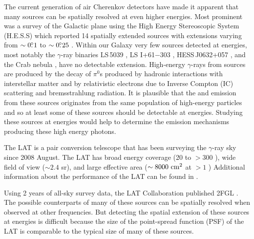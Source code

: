 The current generation of air Cherenkov detectors have made it apparent
that many sources can be spatially resolved at even higher energies.
Most prominent was a survey of the Galactic plane using the High Energy
Stereoscopic System (H.E.S.S) which reported 14 spatially extended
sources with extensions varying from $\sim0\mbox{$.\!\!^\circ$}1$ to $\sim0\mbox{$.\!\!^\circ$}25$
\citep{aharonian_2006_h.e.s.s.-survey}.  Within our Galaxy very few
sources detected at \tev energies, most notably the $\gamma$-ray
binaries LS\,5039 \citep{aharonian_2006a_orbital-modulation},
LS I+61$-$303 \citep{albert_2006a_variable-very-high-energy,
acciari_2011a_veritas-observations}, HESS\,J0632+057
\citep{aharonian_2007a_discovery-point-like}, and the Crab nebula
\citep{weekes_1989a_observation-gamma}, have no detectable extension.
High-energy $\gamma$-rays from \tev sources are produced by the decay
of $\pi^0$s produced by hadronic interactions with interstellar matter
and by relativistic electrons due to Inverse Compton (IC) scattering and
bremsstrahlung radiation.  It is plausible that the \gev and \tev emission
from these sources originates from the same population of high-energy
particles and so at least some of these sources should be detectable at
\gev energies.  Studying these \tev sources at \gev energies would help
to determine the emission mechanisms producing these high energy photons.

The LAT is a pair conversion telescope that has been surveying
the $\gamma$-ray sky since 2008 August.  The LAT has broad energy
coverage (20 \mev to $>300$ \gev), wide field of view ($\sim 2.4$
sr), and large effective area ($\sim 8000\ \cm^2$ at $>1$ \gev)
Additional information about the performance of the LAT can be found
in \cite{atwood_2009a_large-telescope}.

Using 2 years of all-sky survey data, the LAT Collaboration published
2FGL \citep[2FGL,][]{nolan_2012_fermi-large}.  The possible counterparts
of many of these sources can be spatially resolved when observed at other
frequencies. But detecting the spatial extension of these sources at \gev
energies is difficult because the size of the point-spread function (PSF)
of the LAT is comparable to the typical size of many of these sources.

